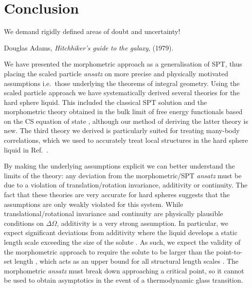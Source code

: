 \documentclass[11pt,twoside]{report}
\begin{document}
\chapter{Conclusion}
\epigraph{We demand rigidly defined areas of doubt and uncertainty!}{Douglas Adams, \emph{Hitchhiker's guide to the galaxy}, (1979).}

We have presented the morphometric approach as a generalisation of SPT, thus placing the scaled particle \emph{ansatz} on more precise and physically motivated assumptions i.e.\ those underlying the theorems of integral geometry.
Using the scaled particle approach we have systematically derived several theories for the hard sphere liquid.
This included the classical SPT solution and the morphometric theory obtained in the bulk limit of free energy functionals based on the CS equation of state%
,
although our method of deriving the latter theory is new.
The third theory we derived is particularly suited for treating many-body correlations, which we used to accurately treat local structures in the hard sphere liquid in Ref.\ \cite{RobinsonPRL2019}.

By making the underlying assumptions explicit we can better understand the limits of the theory: any deviation from the morphometric/SPT \emph{ansatz} must be due to a violation of translation/rotation invariance, additivity or continuity.
The fact that these theories are very accurate for hard spheres suggests that the assumptions are only weakly violated for this system.
While translational/rotational invariance and continuity are physically plausible conditions on $\Delta \Omega$, additivity is a very strong assumption.
In particular, we expect significant deviations from additivity where the liquid develops a static length scale exceeding the size of the solute \cite{KonigPRL2004}.
As such, we expect the validity of the morphometric approach to require the solute to be larger than the point-to-set length \cite{MontanariJSP2006}, which acts as an upper bound for all structural length scales \cite{YaidaPRE2016}.
The morphometric \emph{ansatz} must break down approaching a critical point, so it cannot be used to obtain asymptotics in the event of a thermodynamic glass transition.
\end{document}
